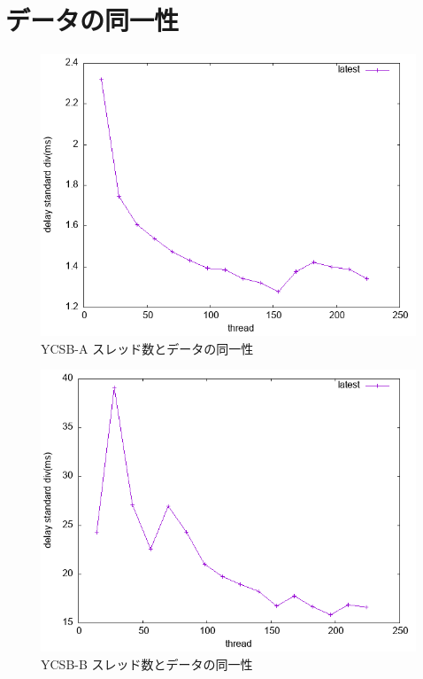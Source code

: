 \documentclass[a4paper]{jreport}	%
\begin{document}


\section{データの同一性}

\begin{figure}[h] 
\centering
\includegraphics[width=15cm]{data/stable/ycsb-a/std-div}
\caption{YCSB-A スレッド数とデータの同一性}
\label{fig:std-div-a}
\end{figure}

\begin{figure}[h] 
\centering
\includegraphics[width=15cm]{data/stable/ycsb-b/std-div}
\caption{YCSB-B スレッド数とデータの同一性}
\label{fig:std-div-b}
\end{figure}
\end{document}
